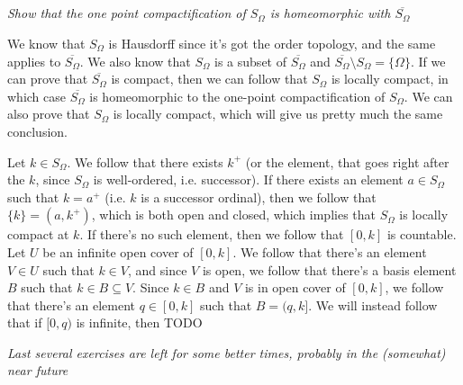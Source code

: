 \documentclass[11pt,oneside,titlepage]{book}
\newcommand{\set}[1]{\{ #1 \}}
\begin{document}
\subsection{}

\textit{Show that the one point compactification of $S_\Omega$ is homeomorphic
  with $\overline{S_\Omega}$}

We know that $S_\Omega$ is Hausdorff since it's got the order topology, and the same
applies to $\overline{S_\Omega}$. 
We also know that $S_\Omega$ is a subset of $\overline{S_\Omega}$ and $\overline{S_\Omega} \setminus
S_\Omega = \set{\Omega}$. If we can prove that $\overline{S_\Omega}$ is compact, then we can
follow that $S_\Omega$ is locally compact, in which case $\overline{S_\Omega}$ is homeomorphic
to the one-point compactification of $S_\Omega$. We can also prove that $S_\Omega$ is
locally compact, which will give us pretty much the same conclusion.

Let $k \in S_\Omega$. We follow that there exists $k^+$ (or the element, that goes right after
the $k$, since $S_\Omega$ is well-ordered, i.e. successor). If there exists an element
$a \in S_\Omega$ such that $k = a^+$ (i.e. $k$ is a successor ordinal), then we follow that
$\set{k} = (a, k^+)$, which is both open and closed, which implies that $S_\Omega$ is
locally compact at $k$. If there's no such element, then we follow that
$[0, k]$ is countable. Let $U$ be an infinite open cover of $[0, k]$. We follow that there's
an element $V \in U$ such that $k \in V$, and since $V$ is open, we follow that there's a
basis element $B$ such that $k \in B \subseteq V$. Since $k \in B$ and $V$ is in open cover
of $[0, k]$, we follow that there's an element $q \in [0, k]$ such that $B = (q, k]$.  We will
instead follow that if $[0, q)$ is infinite, then TODO


\textit{Last several exercises are left for some better times, probably in the (somewhat)
  near future}
\end{document}
